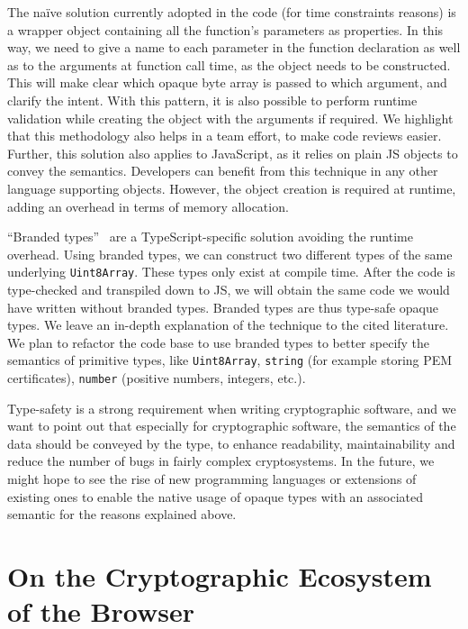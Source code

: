The na\"ive solution currently adopted in the code (for time constraints reasons)
is a wrapper object containing all the function's parameters
as properties. In this way, we need to give a name to each parameter
in the function declaration as well as to the arguments at function call
time, as the object needs to be constructed. This will make clear which
opaque byte array is passed to which argument, and clarify the intent.
With this pattern, it is also possible to perform runtime validation
while creating the object with the arguments if required.
We highlight that this methodology also helps in a team effort, to make
code reviews easier. Further, this solution also applies to JavaScript,
as it relies on plain JS objects to convey the semantics. 
Developers can benefit from this technique in any other language supporting objects.
However, the object creation is required at runtime, adding 
an overhead in terms of memory allocation.

``Branded types''~\cite{vanderkam2019effective, goldberg2022learning}
are a TypeScript-specific solution avoiding the runtime overhead.
Using branded types, we can construct two 
different types of the same underlying \texttt{Uint8Array}.
These types only exist at compile time. 
After the code is type-checked and transpiled down to JS,
we will obtain the same code we would have written without branded types.
Branded types are thus type-safe opaque types. We leave an in-depth explanation
of the technique to the cited literature. We plan to refactor the code base
to use branded types to better specify the semantics of primitive types,
like \texttt{Uint8Array}, \texttt{string} (for example storing PEM certificates),
\texttt{number} (positive numbers, integers, etc.).

Type-safety is a strong requirement when writing
cryptographic software, and we want to point out that especially for cryptographic
software, the semantics of the data should be conveyed by the type,
to enhance readability, maintainability and reduce the number of
bugs in fairly complex cryptosystems.
In the future, we
might hope to see the rise of new programming languages
or extensions of existing ones to enable the native usage
of opaque types with an associated semantic for the reasons 
explained above.

\section{On the Cryptographic Ecosystem of the Browser}\label{sc:gap-webcrypto-api}

